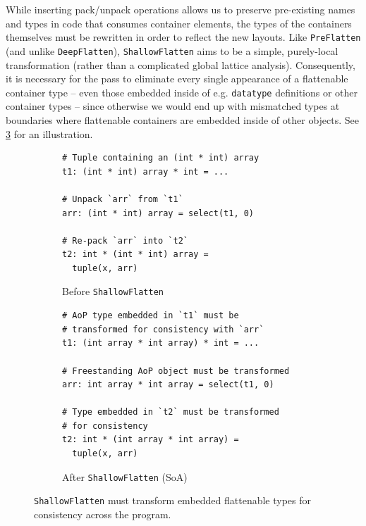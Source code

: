 While inserting pack/unpack operations allows us to preserve pre-existing names
and types in code that consumes container elements, the types of the containers
themselves must be rewritten in order to reflect the new layouts. Like
\texttt{PreFlatten} (and unlike \texttt{DeepFlatten}), \texttt{ShallowFlatten}
aims to be a simple, purely-local transformation (rather than a complicated
global lattice analysis). Consequently, it is necessary for the pass to
eliminate every single appearance of a flattenable container type -- even those
embedded inside of e.g. \texttt{datatype} definitions or other container types
-- since otherwise we would end up with mismatched types at boundaries where
flattenable containers are embedded inside of other objects. See
\cref{fig:soa_flat_deep_example} for an illustration.


\begin{figure}[htbp]
  \centering
  \begin{subfigure}[t]{0.48\textwidth}
    \caption{Before \texttt{ShallowFlatten}}
    \label{fig:soa_flat_deep_before}
    \vspace{1mm}
\begin{verbatim}
# Tuple containing an (int * int) array
t1: (int * int) array * int = ...

# Unpack `arr` from `t1`
arr: (int * int) array = select(t1, 0)

# Re-pack `arr` into `t2`
t2: int * (int * int) array =
  tuple(x, arr)
\end{verbatim}
  \end{subfigure}\hfill
  \begin{subfigure}[t]{0.48\textwidth}
    \caption{After \texttt{ShallowFlatten} (SoA)}
    \label{fig:soa_flat_deep_after}
    \vspace{1mm}
\begin{verbatim}
# AoP type embedded in `t1` must be
# transformed for consistency with `arr`
t1: (int array * int array) * int = ...

# Freestanding AoP object must be transformed
arr: int array * int array = select(t1, 0)

# Type embedded in `t2` must be transformed
# for consistency
t2: int * (int array * int array) =
  tuple(x, arr)
\end{verbatim}
  \end{subfigure}

  \caption{\texttt{ShallowFlatten} must transform embedded flattenable types for
           consistency across the program.}

  \label{fig:soa_flat_deep_example}
\end{figure}


